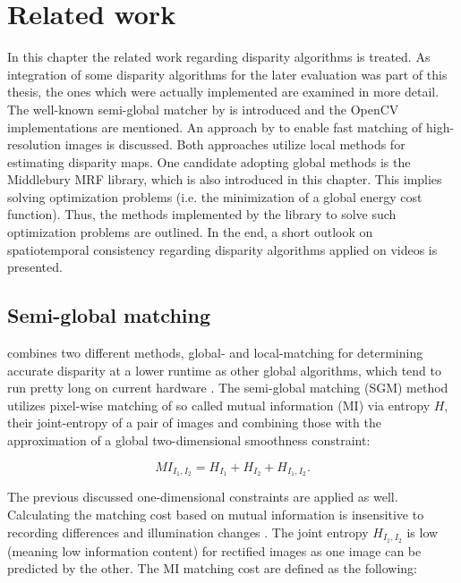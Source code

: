 \chapter{Related work}
\label{chap:related}

In this chapter the related work regarding disparity algorithms is treated.
As integration of some disparity algorithms for the later evaluation was part of this thesis, the ones which were actually implemented are examined in more detail.
The well-known semi-global matcher by \citeauthor{hirschmuller2005accurate} is introduced and the OpenCV implementations are mentioned.
An approach by \citeauthor{Geiger2010ACCV} to enable fast matching of high-resolution images is discussed.
Both approaches utilize local methods for estimating disparity maps.
One candidate adopting global methods is the Middlebury MRF library, which is also introduced in this chapter.
This implies solving optimization problems (i.e. the minimization of a global energy cost function).
Thus, the methods implemented by the library to solve such optimization problems are outlined.
In the end, a short outlook on spatiotemporal consistency regarding disparity algorithms applied on videos is presented.

\section{Semi-global matching}

\citeauthor{hirschmuller2005accurate} combines two different methods, global- and local-matching for determining accurate disparity at a lower runtime as other global algorithms, which tend to run pretty long on current hardware \citep{hirschmuller2005accurate, hirschmuller2008stereo}.
\newline\newline\noindent The semi-global matching (SGM) method utilizes pixel-wise matching of so called mutual information (MI) via entropy $H$, their joint-entropy of a pair of images and combining those with the approximation of a global two-dimensional smoothness constraint:

\begin{equation}
  MI_{I_1,I_2} = H_{I_1} + H_{I_2} + H_{I_1,I_2}.
\end{equation}

\noindent The previous discussed one-dimensional constraints are applied as well.
Calculating the matching cost based on mutual information is insensitive to recording differences and illumination changes \citep{hirschmuller2005accurate, viola1997alignment}.
The joint entropy $H_{I_1,I_2}$ is low (meaning low information content) for rectified images as one image can be predicted by the other.
The MI matching cost are defined as the following:

